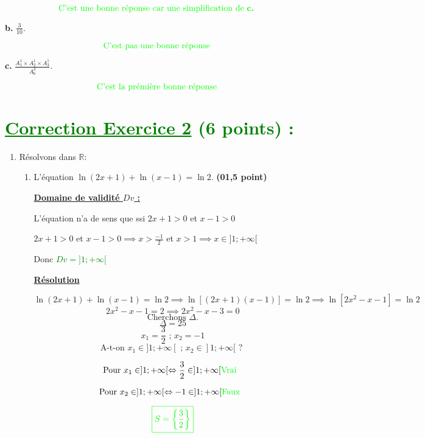\documentclass[12pt]{article}
\begin{document}
\[\text{\textcolor{green} {C'est une bonne réponse car une simplification de \textbf{c.} }}\]

\textbf{b.} $\frac{3}{10}$.

 \[\text{\textcolor{green} { C'est pas une bonne réponse }}\]

\textbf{c.} $\frac{ A_{1}^{1}\times A_{2}^{1}\times A_{3}^{1}}{ A_{6}^{3} }$.

\[\text{\textcolor{green} {C'est la prémière bonne réponse }}\]
 
\section*{\textcolor{green}{\underline{Correction Exercice 2} (6 points) :}}
\begin{enumerate}
\item Résolvons dans $\mathbb{R}$:
	\begin{enumerate}
	\item L'équation $\ln(2x+1)+\ln(x-1)=\ln2$. \textbf{(01,5 point)}
	
	\textbf{\underline{Domaine de validité $Dv$ :} }
	
		L'équation n'a de sens que ssi $2x+1>0$ et $x-1>0$
		
			$2x+1>0$ et $x-1>0\implies x>\frac{-1}{2}$ et $x>1\implies x\in ]1;+\infty[$

			Donc \textcolor{green} {$Dv=]1;+\infty[$}
			
	\textbf{\underline{Résolution}} 
	
\[\ln(2x+1)+\ln(x-1)=\ln2\implies \ln\left[(2x+1)(x-1)\right]=\ln2\implies \ln\left[2x^{2}-x-1\right]=\ln2\]
\[2x^{2}-x-1=2\implies 2x^{2}-x-3=0\]
\[\text{Cherchons }\Delta.\]
\[\Delta=25\]
\[x_{1}=\frac{3}{2} \text{ ; } x_{2}=-1\]
\[\text{A-t-on } x_{1} \in ]1;+\infty[ \text{ ; } x_{2} \in ]1;+\infty[ \text{ ? }\]
	
\[\text{Pour }	x_{1} \in ]1;+\infty[ \Leftrightarrow \frac{3}{2} \in ]1;+\infty[ \text{\textcolor{green} { Vrai } }\]

\[\text{Pour }	x_{2} \in ]1;+\infty[ \Leftrightarrow -1 \in ]1;+\infty[ \text{\textcolor{green} { Faux } }\]

\[\textcolor{green}{\boxed{S=\left\lbrace \frac{3}{2} \right\rbrace}}\]


\end{enumerate}
\end{enumerate}
\end{document}
